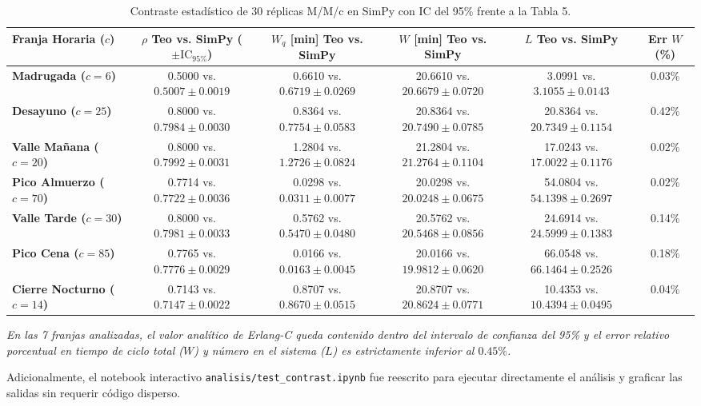 \documentclass[11pt,letterpaper]{article}
\begin{document}
\begin{table}[htbp]
\centering
\small
\caption{Contraste estadístico de 30 réplicas M/M/c en SimPy con IC del 95\% frente a la Tabla 5.}
\begin{tabularx}{\textwidth}{l c c c c c}
\toprule
\textbf{Franja Horaria ($c$)} & $\rho$ Teo vs. SimPy ($\pm \text{IC}_{95\%}$) & $W_q$ [min] Teo vs. SimPy & $W$ [min] Teo vs. SimPy & $L$ Teo vs. SimPy & Err $W$ (\%) \\
\midrule
\textbf{Madrugada ($c=6$)} & 0.5000 vs. $0.5007 \pm 0.0019$ & 0.6610 vs. $0.6719 \pm 0.0269$ & 20.6610 vs. $20.6679 \pm 0.0720$ & 3.0991 vs. $3.1055 \pm 0.0143$ & 0.03\% \\
\textbf{Desayuno ($c=25$)} & 0.8000 vs. $0.7984 \pm 0.0030$ & 0.8364 vs. $0.7754 \pm 0.0583$ & 20.8364 vs. $20.7490 \pm 0.0785$ & 20.8364 vs. $20.7349 \pm 0.1154$ & 0.42\% \\
\textbf{Valle Mañana ($c=20$)} & 0.8000 vs. $0.7992 \pm 0.0031$ & 1.2804 vs. $1.2726 \pm 0.0824$ & 21.2804 vs. $21.2764 \pm 0.1104$ & 17.0243 vs. $17.0022 \pm 0.1176$ & 0.02\% \\
\textbf{Pico Almuerzo ($c=70$)} & 0.7714 vs. $0.7722 \pm 0.0036$ & 0.0298 vs. $0.0311 \pm 0.0077$ & 20.0298 vs. $20.0248 \pm 0.0675$ & 54.0804 vs. $54.1398 \pm 0.2697$ & 0.02\% \\
\textbf{Valle Tarde ($c=30$)} & 0.8000 vs. $0.7981 \pm 0.0033$ & 0.5762 vs. $0.5470 \pm 0.0480$ & 20.5762 vs. $20.5468 \pm 0.0856$ & 24.6914 vs. $24.5999 \pm 0.1383$ & 0.14\% \\
\textbf{Pico Cena ($c=85$)} & 0.7765 vs. $0.7776 \pm 0.0029$ & 0.0166 vs. $0.0163 \pm 0.0045$ & 20.0166 vs. $19.9812 \pm 0.0620$ & 66.0548 vs. $66.1464 \pm 0.2526$ & 0.18\% \\
\textbf{Cierre Nocturno ($c=14$)} & 0.7143 vs. $0.7147 \pm 0.0022$ & 0.8707 vs. $0.8670 \pm 0.0515$ & 20.8707 vs. $20.8624 \pm 0.0771$ & 10.4353 vs. $10.4394 \pm 0.0495$ & 0.04\% \\
\bottomrule
\end{tabularx}
\vspace{0.2em}
\raggedright \footnotesize \textit{En las 7 franjas analizadas, el valor analítico de Erlang-C queda contenido dentro del intervalo de confianza del 95\% y el error relativo porcentual en tiempo de ciclo total ($W$) y número en el sistema ($L$) es estrictamente inferior al $0.45\%$.}
\end{table}

\noindent Adicionalmente, el notebook interactivo \texttt{analisis/test\_contrast.ipynb} fue reescrito para ejecutar directamente el análisis y graficar las salidas sin requerir código disperso.
\end{document}
